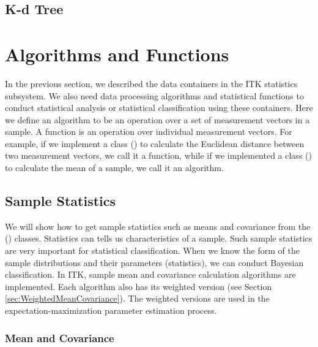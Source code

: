\ifitkFullVersion 

\fi


\subsection{K-d Tree}
\label{sec:KdTree}

\ifitkFullVersion 

\fi

\section{Algorithms and Functions}
\label{sec:StatisticsAlgorithmsFunctions}

In the previous section, we described the data containers in the ITK
statistics subsystem. We also need data processing algorithms and statistical
functions to conduct statistical analysis or statistical classification using
these containers. Here we define an algorithm to be an operation over a set
of measurement vectors in a sample. A function is an operation over
individual measurement vectors. For example, if we implement a class
() to calculate the Euclidean
distance between two measurement vectors, we call it a function, while if we
implemented a class () to calculate
the mean of a sample, we call it an algorithm.

\subsection{Sample Statistics}
\label{sec:SampleStatistics}

We will show how to get sample statistics such as means and covariance from
the () classes. Statistics can tells us
characteristics of a sample. Such sample statistics are very important for
statistical classification. When we know the form of the sample distributions
and their parameters (statistics), we can conduct Bayesian classification. In
ITK, sample mean and covariance calculation algorithms are implemented. Each
algorithm also has its weighted version (see Section
\ref{sec:WeightedMeanCovariance}). The weighted versions are used in the
expectation-maximization parameter estimation process.

\subsubsection{Mean and Covariance}
\label{sec:MeanCovariance}

